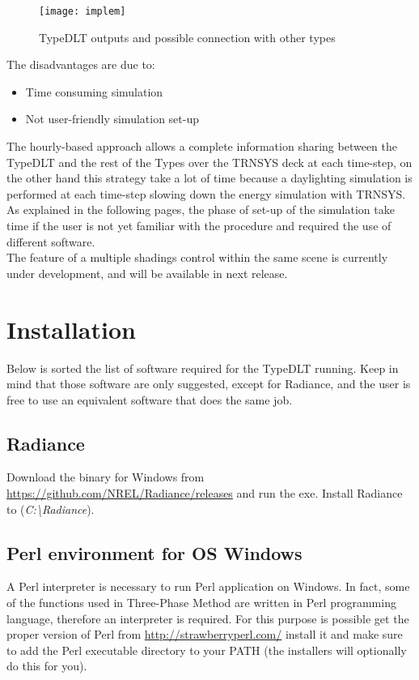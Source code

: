 \begin{figure}[h]
\centering
\texttt{[image: implem]}
\caption{\label{img2:implem} TypeDLT outputs and possible connection with other types}
\end{figure}

The disadvantages are due to:
\begin{itemize}
\renewcommand{\labelitemi}{\tiny$\blacksquare$}
\item Time consuming simulation
\item Not user-friendly simulation set-up
\end{itemize}

The hourly-based approach allows a complete information sharing between the TypeDLT and the rest of the Types over the TRNSYS deck at each time-step, on the other hand this strategy take a lot of time because a daylighting simulation is performed at each time-step slowing down the energy simulation with TRNSYS.\\
As explained in the following pages, the phase of set-up of the simulation take time if the user is not yet familiar with the procedure and required the use of different software.\\
The feature of a multiple shadings control within the same scene is currently under development, and will be available in next release.

\section{Installation}
Below is sorted the list of software required for the TypeDLT running. Keep in mind that those software are only suggested, except for Radiance, and the user is free to use an equivalent software that does the same job.

\subsection{Radiance}
Download the binary for Windows from \url{https://github.com/NREL/Radiance/releases} and run the exe. Install Radiance to (\textit{C:\textbackslash Radiance}).

\subsection{Perl environment for OS Windows}
A Perl interpreter is necessary to run Perl application on Windows. In fact, some of the functions used in Three-Phase Method are written in Perl programming language, therefore an interpreter is required. 
For this purpose is possible get the proper version of Perl from \url{http://strawberryperl.com/} install it and make sure to add the Perl executable directory to your PATH (the installers will optionally do this for you).

